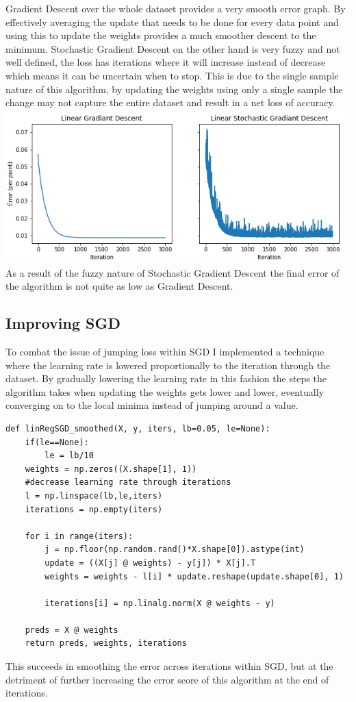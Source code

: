 Gradient Descent over the whole dataset provides a very smooth error graph. By effectively averaging the update that needs to be done for every data point and using this to update the weights provides a much smoother descent to the minimum.
Stochastic Gradient Descent on the other hand is very fuzzy and not well defined, the loss has iterations where it will increase instead of decrease which means it can be uncertain when to stop. This is due to the single sample nature of this algorithm, by updating the weights using only a single sample the change may not capture the entire dataset and result in a net loss of accuracy.
\includegraphics[width=\linewidth]{figs/GD vs SGD.png}
As a result of the fuzzy nature of Stochastic Gradient Descent the final error of the algorithm is not quite as low as Gradient Descent. 
\subsection{Improving SGD}
To combat the issue of jumping loss within SGD I implemented a technique where the learning rate is lowered proportionally to the iteration through the dataset. By gradually lowering the learning rate in this fashion the steps the algorithm takes when updating the weights gets lower and lower, eventually converging on to the local minima instead of jumping around a value.
\begin{listing}[H]
    \begin{verbatim}
def linRegSGD_smoothed(X, y, iters, lb=0.05, le=None):
    if(le==None):
        le = lb/10
    weights = np.zeros((X.shape[1], 1))
    #decrease learning rate through iterations
    l = np.linspace(lb,le,iters)
    iterations = np.empty(iters)
    
    for i in range(iters):  
        j = np.floor(np.random.rand()*X.shape[0]).astype(int)
        update = ((X[j] @ weights) - y[j]) * X[j].T
        weights = weights - l[i] * update.reshape(update.shape[0], 1)
      
        iterations[i] = np.linalg.norm(X @ weights - y)
        
    preds = X @ weights
    return preds, weights, iterations
    \end{verbatim}
\end{listing}
This succeeds in smoothing the error across iterations within SGD, but at the detriment of further increasing the error score of this algorithm at the end of iterations.

